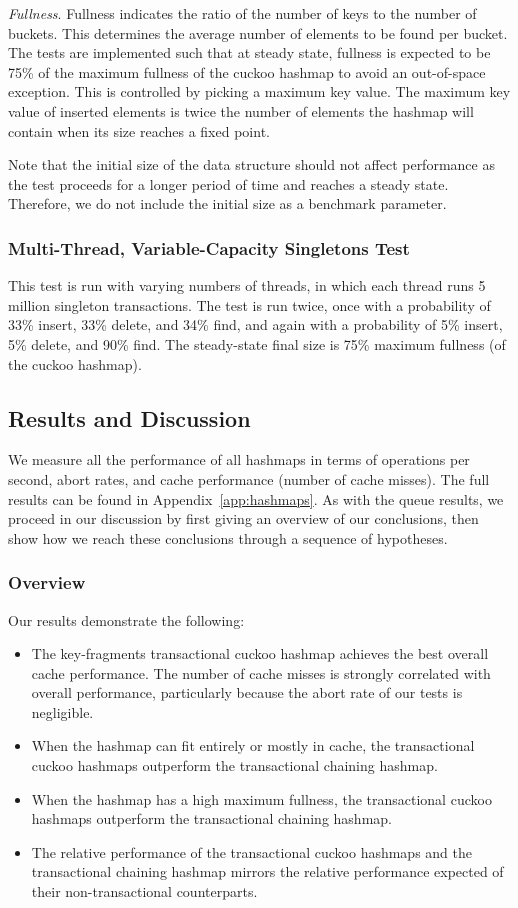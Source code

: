     \emph{Fullness}. Fullness indicates the ratio of the number of keys to the number of buckets. This determines the average number of elements to be found per bucket. The tests are implemented such that at steady state, fullness is expected to be 75\% of the maximum fullness of the cuckoo hashmap to avoid an out-of-space exception. This is controlled by picking a maximum key value. The maximum key value of inserted elements is twice the number of elements the hashmap will contain when its size reaches a fixed point.

        Note that the initial size of the data structure should not affect performance as the test proceeds for a longer period of time and reaches a steady state. Therefore, we do not include the initial size as a benchmark parameter.

\subsubsection{Multi-Thread, Variable-Capacity Singletons Test} 
This test is run with varying numbers of threads, in which each thread runs 5 million singleton transactions.
The test is run twice, once with a probability of 33\% insert, 33\% delete, and 34\% find, and again with a probability of 5\% insert, 5\% delete, and 90\% find. The steady-state final size is 75\% maximum fullness (of the cuckoo hashmap).

\subsection{Results and Discussion}

We measure all the performance of all hashmaps in terms of operations per second, abort rates, and cache performance (number of cache misses). 
The full results can be found in Appendix~\ref{app:hashmaps}. As with the queue results, we proceed in our discussion by first giving an overview of our conclusions, then show how we reach these conclusions through a sequence of hypotheses.

\subsubsection{Overview}
Our results demonstrate the following:
\begin{itemize}
    \item The key-fragments transactional cuckoo hashmap achieves the best overall cache performance. The number of cache misses is strongly correlated with overall performance, particularly because the abort rate of our tests is negligible.
    \item When the hashmap can fit entirely or mostly in cache, the transactional cuckoo hashmaps outperform the transactional chaining hashmap.
    \item When the hashmap has a high maximum fullness, the transactional cuckoo hashmaps outperform the transactional chaining hashmap.
    \item The relative performance of the transactional cuckoo hashmaps and the transactional chaining hashmap mirrors the relative performance expected of their non-transactional counterparts.
\end{itemize}

